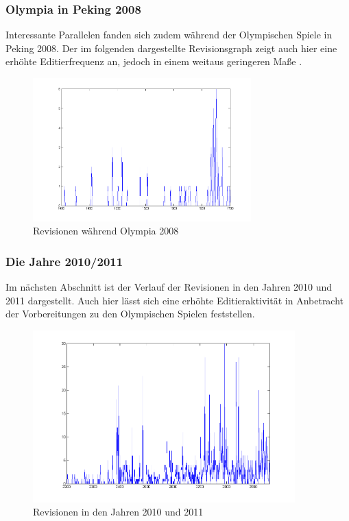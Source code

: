 \documentclass[pagesize=auto, titlepage=on]{scrartcl}
\begin{document}
\subsubsection{Olympia in Peking 2008}
Interessante Parallelen fanden sich zudem während der Olympischen Spiele in Peking 2008. Der im folgenden dargestellte Revisionsgraph zeigt auch hier eine erhöhte Editierfrequenz an, jedoch in einem weitaus geringeren Maße .
\begin{figure}[htb]
  \centering
     \includegraphics*[width=0.75\textwidth]{images/beijing2008.png}
   \caption[Olympia 2008]{Revisionen während Olympia 2008}
   \label{fig:nag_conf}
\end{figure}
\clearpage
\subsubsection{Die Jahre 2010/2011}
Im nächsten Abschnitt ist der Verlauf der Revisionen in den Jahren 2010 und 2011 dargestellt. Auch hier lässt sich eine erhöhte Editieraktivität in Anbetracht der Vorbereitungen zu den Olympischen Spielen feststellen.
\begin{figure}[htb]
  \centering
     \includegraphics*[width=0.9\textwidth]{images/2010-2011.png}
   \caption[2010-2011]{Revisionen in den Jahren 2010 und 2011}
   \label{fig:nag_conf}
\end{figure}
\end{document}

